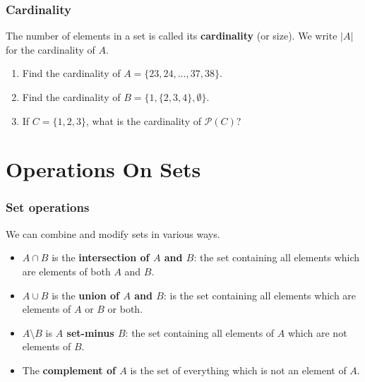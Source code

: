 \documentclass[11pt, compress]{beamer}
\newcommand{\terminology}[1]{\textbf{#1}}\newcommand{\lt}{<}
\newcommand{\pow}{\mathcal P}
\begin{document}
\begin{frame}
\frametitle{Cardinality}
 The number of elements in a set is called its \terminology{cardinality} (or size).  We write \(|A|\) for the cardinality of \(A\).
 \begin{example}[0.3.5]\begin{enumerate}
\item{} Find the cardinality of \(A = \{23, 24, \ldots, 37, 38\}\).


\item{} Find the cardinality of \(B = \{1, \{2, 3, 4\}, \emptyset\}\).


\item{} If \(C = \{1,2,3\}\), what is the cardinality of \(\pow(C)\)?

\end{enumerate}

\end{example}
\end{frame}
 


\section{Operations On Sets}
\begin{frame}
\frametitle{Set operations}
 We can combine and modify sets in various ways.
\pause 

\begin{itemize}[<+->]
\item{} \(A \cap B\) is the \terminology{intersection of \(A\) and \(B\)}: the set containing all elements which are elements of both \(A\) and \(B\).


\item{} \(A \cup B\) is the \terminology{union of \(A\) and \(B\)}: is the set containing all elements which are elements of \(A\) or \(B\) or both.


\item{} \(A \setminus B\) is \terminology{\(A\) set-minus \(B\)}: the set containing all elements of \(A\) which are not elements of \(B\).


\item{} The \terminology{complement of \(A\)} is the set of everything which is not an element of \(A\).

\end{itemize}

\end{frame}
 
\end{document}
